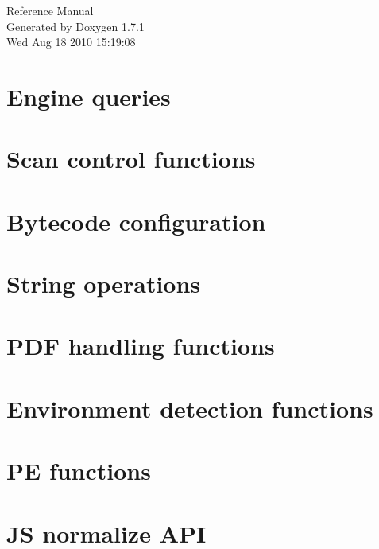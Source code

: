 \documentclass[a4paper]{article}
\begin{document}
\hypersetup{pageanchor=false}
\begin{titlepage}
\vspace*{7cm}
\begin{center}
{\Large Reference Manual}\\
\vspace*{1cm}
{\large Generated by Doxygen 1.7.1}\\
\vspace*{0.5cm}
{\small Wed Aug 18 2010 15:19:08}\\
\end{center}
\end{titlepage}
\tableofcontents
{}
\hypersetup{pageanchor=true}
\section{Engine queries}
\label{engineq}
\hypertarget{engineq}{}

\section{Scan control functions}
\label{scanc}
\hypertarget{scanc}{}

\section{Bytecode configuration}
\label{config}
\hypertarget{config}{}

\section{String operations}
\label{stringops}
\hypertarget{stringops}{}

\section{PDF handling functions}
\label{pdfg}
\hypertarget{pdfg}{}

\section{Environment detection functions}
\label{envdet}
\hypertarget{envdet}{}

\section{PE functions}
\label{pe}
\hypertarget{pe}{}

\section{JS normalize API}
\label{js}
\hypertarget{js}{}

\end{document}

